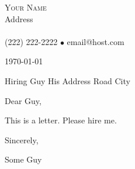 \documentclass{article}
\newcommand{\lineunder}{\vspace*{-8pt} \\ \hspace*{-18pt} \hrulefill \\}
\newcommand{\contact}[3]{
\vspace*{-8pt}
\begin{center}
{\LARGE \scshape {#1}}\\
#2 \lineunder 
#3
\end{center}
\vspace*{-8pt}
}
\begin{document}
\normalsize
\smallskip
\vspace*{-44pt}

\contact{Your Name}
{Address}
{(222) 222-2222 $\bullet$ email@host.com}

\vspace{10mm}

\today \newline

Hiring Guy \newline
His Address \newline
Road \newline
City \newline

\vspace{7mm}

Dear Guy,

\vspace{2mm}

This is a letter. Please hire me.

\vspace{2mm}

Sincerely,

\vspace{2mm}

Some Guy
\end{document}
